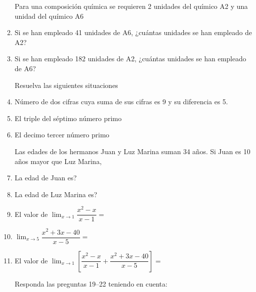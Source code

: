 \documentclass[letterpaper,twoside]{article}
\begin{document}
\begin{multicols}{2}
\begin{enumerate}
Para una composición química se requieren 2 unidades del químico A2 y una unidad del químico A6
\item Si se han empleado 41 unidades de A6, ¿cuántas unidades se han empleado de A2?
\item Si se han empleado 182 unidades de A2, ¿cuántas unidades se han empleado de A6?

Resuelva las siguientes situaciones
\item Número de dos cifras cuya suma de sus cifras es 9 y su diferencia es 5.
\item El triple del séptimo número primo
\item El decimo tercer número primo

Las edades de los hermanos Juan y Luz Marina suman 34 años. Si Juan es 10 años mayor que Luz Marina, 
\item La edad de Juan es?
\item La edad de Luz Marina es?
\item El valor de $\displaystyle{\lim_{x\rightarrow 1}\dfrac{x^{2}-x}{x-1}}=$
\item $\displaystyle{\lim_{x\rightarrow 5}\dfrac{x^{2}+3x-40}{x-5}}=$
\item El valor de $\displaystyle{\lim_{x\rightarrow 1}\left[\dfrac{x^{2}-x}{x-1}+\dfrac{x^{2}+3x-40}{x-5}\right]}=$

Responda las preguntas 19--22 teniendo en cuenta:


\end{enumerate}
\end{multicols}
\end{document}
